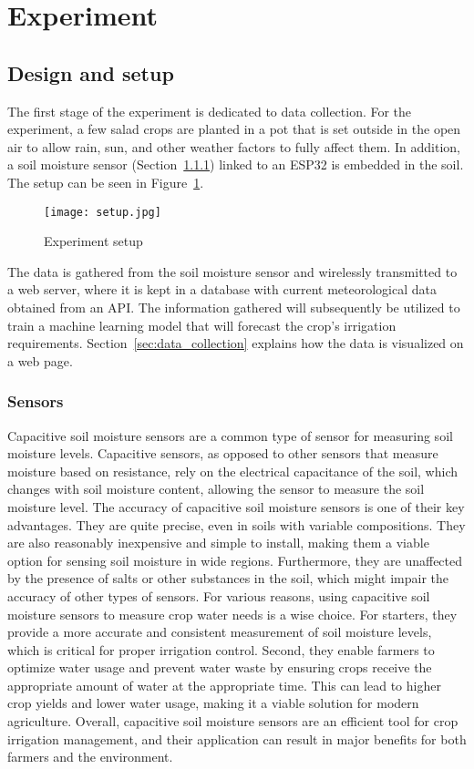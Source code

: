 \documentclass[11pt]{scrartcl} %
\begin{document}
\section{Experiment}
\subsection{Design and setup}
The first stage of the experiment is dedicated to data collection. For the experiment, a few salad crops are planted in a pot that is set outside in the open air to allow rain, sun, and other weather factors to fully affect them. In addition, a soil moisture sensor (Section~\ref{sec:sensors}) linked to an ESP32 is embedded in the soil. The setup can be seen in Figure~\ref{fig:experiment_setup}.
\begin{figure}[h]
	\centering
	\texttt{[image: setup.jpg]}
	\caption{Experiment setup}
	\label{fig:experiment_setup}
\end{figure}
The data is gathered from the soil moisture sensor and wirelessly transmitted to a web server, where it is kept in a database with current meteorological data obtained from an API. The information gathered will subsequently be utilized to train a machine learning model that will forecast the crop's irrigation requirements. Section~\ref{sec:data_collection} explains how the data is visualized on a web page.

\subsubsection{Sensors}
\label{sec:sensors}
Capacitive soil moisture sensors are a common type of sensor for measuring soil moisture levels. Capacitive sensors, as opposed to other sensors that measure moisture based on resistance, rely on the electrical capacitance of the soil, which changes with soil moisture content, allowing the sensor to measure the soil moisture level.
\newline The accuracy of capacitive soil moisture sensors is one of their key advantages. They are quite precise, even in soils with variable compositions. They are also reasonably inexpensive and simple to install, making them a viable option for sensing soil moisture in wide regions. Furthermore, they are unaffected by the presence of salts or other substances in the soil, which might impair the accuracy of other types of sensors.
\newline For various reasons, using capacitive soil moisture sensors to measure crop water needs is a wise choice. For starters, they provide a more accurate and consistent measurement of soil moisture levels, which is critical for proper irrigation control. Second, they enable farmers to optimize water usage and prevent water waste by ensuring crops receive the appropriate amount of water at the appropriate time. This can lead to higher crop yields and lower water usage, making it a viable solution for modern agriculture. Overall, capacitive soil moisture sensors are an efficient tool for crop irrigation management, and their application can result in major benefits for both farmers and the environment.
\end{document}
